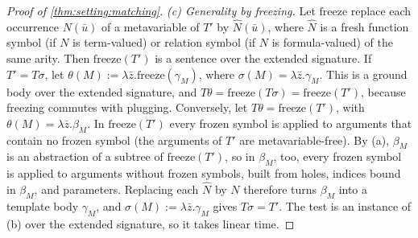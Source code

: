 \begin{proof}[Proof of \cref{thm:setting:matching}]
\emph{(c) Generality by freezing.} Let $\mathrm{freeze}$ replace each occurrence $N(\bar u)$ of a metavariable of $T'$ by $\hat N(\bar u)$, where $\hat N$ is a fresh function symbol (if $N$ is term-valued) or relation symbol (if $N$ is formula-valued) of the same arity. Then $\mathrm{freeze}(T')$ is a sentence over the extended signature. If $T'=T\sigma$, let $\theta(M):=\lambda\bar z.\mathrm{freeze}(\gamma_M)$, where $\sigma(M)=\lambda\bar z.\gamma_M$. This is a ground body over the extended signature, and $T\theta=\mathrm{freeze}(T\sigma)=\mathrm{freeze}(T')$, because freezing commutes with plugging. Conversely, let $T\theta=\mathrm{freeze}(T')$, with $\theta(M)=\lambda\bar z.\beta_M$. In $\mathrm{freeze}(T')$ every frozen symbol is applied to arguments that contain no frozen symbol (the arguments of $T'$ are metavariable-free). By (a), $\beta_M$ is an abstraction of a subtree of $\mathrm{freeze}(T')$, so in $\beta_M$, too, every frozen symbol is applied to arguments without frozen symbols, built from holes, indices bound in $\beta_M$, and parameters. Replacing each $\hat N$ by $N$ therefore turns $\beta_M$ into a template body $\gamma_M$, and $\sigma(M):=\lambda\bar z.\gamma_M$ gives $T\sigma=T'$. The test is an instance of (b) over the extended signature, so it takes linear time.


\end{proof}
